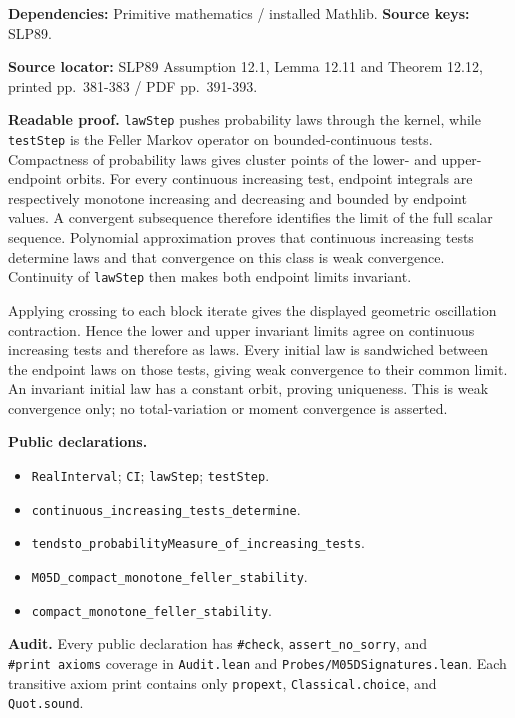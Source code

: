 \documentclass[
  11pt,
]{article}
\providecommand{\tightlist}{%
  \setlength{\itemsep}{0pt}\setlength{\parskip}{0pt}}
\let\LedgerOriginalTexttt\texttt
\renewcommand{\texttt}[1]{{\small\LedgerOriginalTexttt{#1}}}
\begin{document}
\textbf{Dependencies:} Primitive mathematics / installed Mathlib.
\textbf{Source keys:} SLP89.

\textbf{Source locator:} SLP89 Assumption 12.1, Lemma 12.11 and Theorem
12.12, printed pp.~381-383 / PDF pp.~391-393.

\textbf{Readable proof.} \texttt{lawStep} pushes probability laws
through the kernel, while \texttt{testStep} is the Feller Markov
operator on bounded-continuous tests. Compactness of probability laws
gives cluster points of the lower- and upper-endpoint orbits. For every
continuous increasing test, endpoint integrals are respectively monotone
increasing and decreasing and bounded by endpoint values. A convergent
subsequence therefore identifies the limit of the full scalar sequence.
Polynomial approximation proves that continuous increasing tests
determine laws and that convergence on this class is weak convergence.
Continuity of \texttt{lawStep} then makes both endpoint limits
invariant.

Applying crossing to each block iterate gives the displayed geometric
oscillation contraction. Hence the lower and upper invariant limits
agree on continuous increasing tests and therefore as laws. Every
initial law is sandwiched between the endpoint laws on those tests,
giving weak convergence to their common limit. An invariant initial law
has a constant orbit, proving uniqueness. This is weak convergence only;
no total-variation or moment convergence is asserted.

\textbf{Public declarations.}

\begin{itemize}
\tightlist
\item
  \texttt{RealInterval}; \texttt{CI}; \texttt{lawStep};
  \texttt{testStep}.
\item
  \texttt{continuous\_increasing\_tests\_determine}.
\item
  \texttt{tendsto\_probabilityMeasure\_of\_increasing\_tests}.
\item
  \texttt{M05D\_compact\_monotone\_feller\_stability}.
\item
  \texttt{compact\_monotone\_feller\_stability}.
\end{itemize}

\textbf{Audit.} Every public declaration has \texttt{\#check},
\texttt{assert\_no\_sorry}, and \texttt{\#print\ axioms} coverage in
\texttt{Audit.lean} and \texttt{Probes/M05DSignatures.lean}. Each
transitive axiom print contains only \texttt{propext},
\texttt{Classical.choice}, and \texttt{Quot.sound}.
\end{document}
